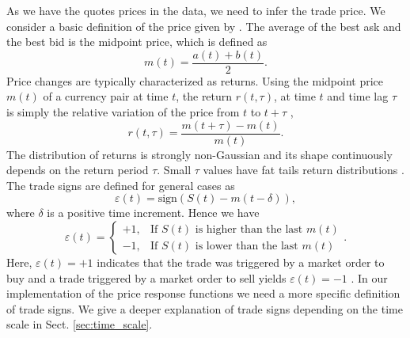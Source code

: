 As we have the quotes prices in the data, we need to infer the trade price. We
consider a basic definition of the price given by
\cite{forex_liquidity,patterns_forex,political_forex}. The average of the best
ask and the best bid is the midpoint price, which is defined as
\cite{teach_spread,subtle_nature,Bouchaud_2004,my_paper_response_financial,prop_order_book,stat_theory,large_prices_changes,em_stylized_facts}
\begin{equation}
    m \left(t\right) = \frac{a\left(t\right) + b\left(t\right)}{2}.
\end{equation}
Price changes are typically characterized as returns. Using the midpoint price
$m\left( t\right)$ of a currency pair at time $t$, the return
$r\left(t, \tau\right)$, at time $t$ and time lag $\tau$ is simply the relative
variation of the price from $t$ to $t + \tau$
\cite{subtle_nature,empirical_facts,asynchrony_effects_corr,tick_size_impact,causes_epps_effect,non_stationarity},
\begin{equation}\label{eq:midpoint_price_return}
    r\left(t,\tau\right) = \frac{m\left(t+\tau\right)-m\left(t\right)}
    {m\left(t\right)}.
\end{equation}
The distribution of returns is strongly non-Gaussian and its shape continuously
depends on the return period $\tau$. Small $\tau$ values have fat tails return
distributions \cite{subtle_nature}. The trade signs are defined for general
cases as
\begin{equation}\label{eq:trade_sign_general}
    \varepsilon\left(t\right)=\text{sign}\left(S\left(t\right)
    -m\left(t-\delta\right)\right),
\end{equation}
where $\delta$ is a positive time increment. Hence we have
\begin{equation}\label{eq:trade_sign_results}
    \varepsilon\left(t\right)=\left\{
    \begin{array}{cc}
    +1, & \text{If } S\left(t\right)
    \text{ is higher than the last } m\left( t \right)\\
    -1, & \text{If } S\left(t\right)
    \text{ is lower than the last } m\left( t \right)
    \end{array}\right. .
\end{equation}
Here, $\varepsilon(t) = +1$ indicates that the trade was triggered by a market
order to buy and a trade triggered by a market order to sell yields
$\varepsilon(t) = -1$
\cite{subtle_nature,Bouchaud_2004,spread_changes_affect,quant_stock_price_response,order_flow_persistent}.
In our implementation of the price response functions we need a more specific
definition of trade signs. We give a deeper explanation of trade signs
depending on the time scale in Sect. \ref{sec:time_scale}.

